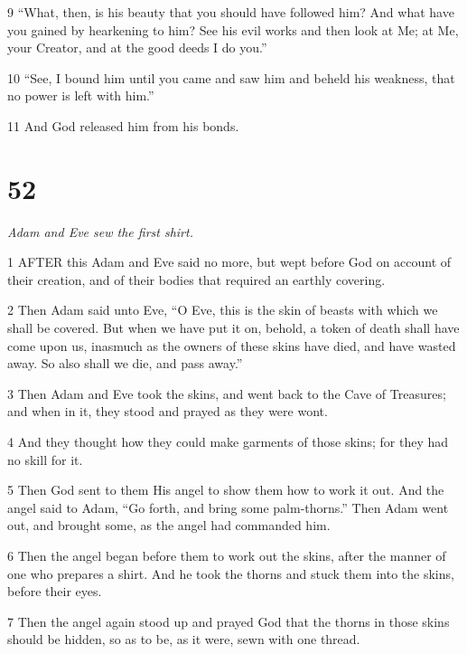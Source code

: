 \par 9 “What, then, is his beauty that you should have followed him? And what have you gained by hearkening to him? See his evil works and then look at Me; at Me, your Creator, and at the good deeds I do you.”

\par 10 “See, I bound him until you came and saw him and beheld his weakness, that no power is left with him.”

\par 11 And God released him from his bonds.

\chapter{52}

\par \textit{Adam and Eve sew the first shirt.}

\par 1 AFTER this Adam and Eve said no more, but wept before God on account of their creation, and of their bodies that required an earthly covering.

\par 2 Then Adam said unto Eve, “O Eve, this is the skin of beasts with which we shall be covered. But when we have put it on, behold, a token of death shall have come upon us, inasmuch as the owners of these skins have died, and have wasted away. So also shall we die, and pass away.”

\par 3 Then Adam and Eve took the skins, and went back to the Cave of Treasures; and when in it, they stood and prayed as they were wont.

\par 4 And they thought how they could make garments of those skins; for they had no skill for it.

\par 5 Then God sent to them His angel to show them how to work it out. And the angel said to Adam, “Go forth, and bring some palm-thorns.” Then Adam went out, and brought some, as the angel had commanded him.

\par 6 Then the angel began before them to work out the skins, after the manner of one who prepares a shirt. And he took the thorns and stuck them into the skins, before their eyes.

\par 7 Then the angel again stood up and prayed God that the thorns in those skins should be hidden, so as to be, as it were, sewn with one thread.

